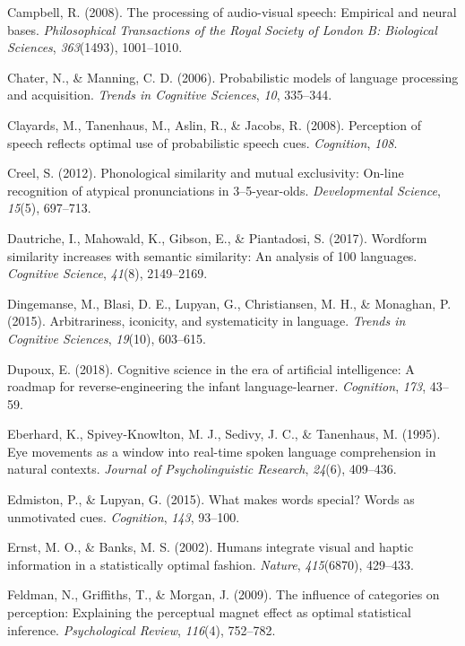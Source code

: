 \documentclass[english,,man,floatsintext]{apa6}
\theoremstyle{definition}
\theoremstyle{definition}
\theoremstyle{definition}
\theoremstyle{remark}
\begin{document}
\hypertarget{ref-Campbell2008}{}
Campbell, R. (2008). The processing of audio-visual speech: Empirical
and neural bases. \emph{Philosophical Transactions of the Royal Society
of London B: Biological Sciences}, \emph{363}(1493), 1001--1010.

\hypertarget{ref-chater06}{}
Chater, N., \& Manning, C. D. (2006). Probabilistic models of language
processing and acquisition. \emph{Trends in Cognitive Sciences},
\emph{10}, 335--344.

\hypertarget{ref-clayard08}{}
Clayards, M., Tanenhaus, M., Aslin, R., \& Jacobs, R. (2008). Perception
of speech reflects optimal use of probabilistic speech cues.
\emph{Cognition}, \emph{108}.

\hypertarget{ref-Creel2012}{}
Creel, S. (2012). Phonological similarity and mutual exclusivity:
On-line recognition of atypical pronunciations in 3--5-year-olds.
\emph{Developmental Science}, \emph{15}(5), 697--713.

\hypertarget{ref-dautriche17}{}
Dautriche, I., Mahowald, K., Gibson, E., \& Piantadosi, S. (2017).
Wordform similarity increases with semantic similarity: An analysis of
100 languages. \emph{Cognitive Science}, \emph{41}(8), 2149--2169.

\hypertarget{ref-dingemanse2015}{}
Dingemanse, M., Blasi, D. E., Lupyan, G., Christiansen, M. H., \&
Monaghan, P. (2015). Arbitrariness, iconicity, and systematicity in
language. \emph{Trends in Cognitive Sciences}, \emph{19}(10), 603--615.

\hypertarget{ref-dupoux2018}{}
Dupoux, E. (2018). Cognitive science in the era of artificial
intelligence: A roadmap for reverse-engineering the infant
language-learner. \emph{Cognition}, \emph{173}, 43--59.

\hypertarget{ref-Eberhard1995}{}
Eberhard, K., Spivey-Knowlton, M. J., Sedivy, J. C., \& Tanenhaus, M.
(1995). Eye movements as a window into real-time spoken language
comprehension in natural contexts. \emph{Journal of Psycholinguistic
Research}, \emph{24}(6), 409--436.

\hypertarget{ref-edmiston2015}{}
Edmiston, P., \& Lupyan, G. (2015). What makes words special? Words as
unmotivated cues. \emph{Cognition}, \emph{143}, 93--100.

\hypertarget{ref-ernst02}{}
Ernst, M. O., \& Banks, M. S. (2002). Humans integrate visual and haptic
information in a statistically optimal fashion. \emph{Nature},
\emph{415}(6870), 429--433.

\hypertarget{ref-feldman2009}{}
Feldman, N., Griffiths, T., \& Morgan, J. (2009). The influence of
categories on perception: Explaining the perceptual magnet effect as
optimal statistical inference. \emph{Psychological Review},
\emph{116}(4), 752--782.
\end{document}
